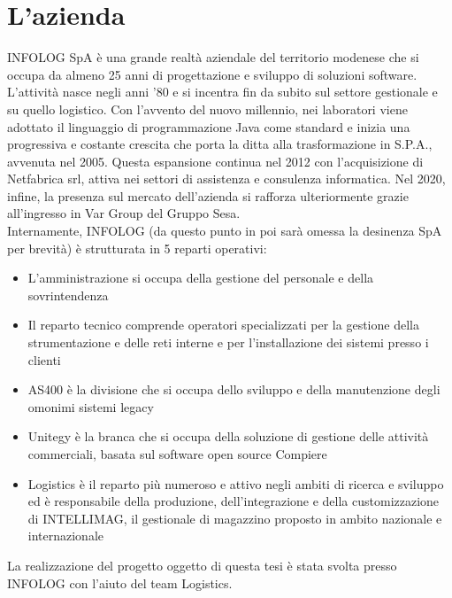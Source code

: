 \chapter{L'azienda}\label{c:company}

INFOLOG SpA è una grande realtà aziendale del territorio modenese che si occupa da almeno 25 anni di progettazione e sviluppo di soluzioni software.
L'attività nasce negli anni '80 e si incentra fin da subito sul settore gestionale e su quello logistico.
Con l'avvento del nuovo millennio, nei laboratori viene adottato il linguaggio di programmazione Java come standard e inizia una progressiva e costante crescita
che porta la ditta alla trasformazione in S.P.A., avvenuta nel 2005.
Questa espansione continua nel 2012 con l'acquisizione di Netfabrica srl, attiva nei settori di assistenza e consulenza informatica.
Nel 2020, infine, la presenza sul mercato dell'azienda si rafforza ulteriormente grazie all'ingresso in Var Group del Gruppo Sesa.
\\
Internamente, INFOLOG (da questo punto in poi sarà omessa la desinenza SpA per brevità) è strutturata in 5 reparti operativi:
\begin{itemize}
    \item L'amministrazione si occupa della gestione del personale e della sovrintendenza
    \item Il reparto tecnico comprende operatori specializzati per la gestione della strumentazione e delle reti interne e per l'installazione dei sistemi presso i clienti
    \item AS400 è la divisione che si occupa dello sviluppo e della manutenzione degli omonimi sistemi legacy
    \item Unitegy è la branca che si occupa della soluzione di gestione delle attività commerciali, basata sul software open source Compiere
    \item Logistics è il reparto più numeroso e attivo negli ambiti di ricerca e sviluppo ed è responsabile della produzione, dell'integrazione e della customizzazione di INTELLIMAG, il gestionale di magazzino proposto in ambito nazionale e internazionale
\end{itemize}
La realizzazione del progetto oggetto di questa tesi è stata svolta presso INFOLOG con l'aiuto del team Logistics.